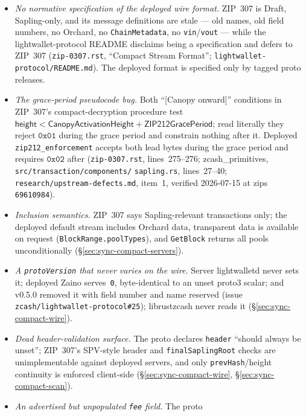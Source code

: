 \documentclass[11pt,a4paper]{article}
\theoremstyle{definition}
\begin{document}
\begin{itemize}
\item \emph{No normative specification of the deployed wire format.}
  ZIP~307 is Draft, Sapling-only, and its message definitions are stale ---
  old names, old field numbers, no Orchard, no \texttt{ChainMetadata}, no
  \texttt{vin}/\texttt{vout} --- while the \textsf{lightwallet-protocol}
  README disclaims being a specification and defers to ZIP~307
  (\texttt{zip-0307.rst}, ``Compact Stream Format'';
  \texttt{lightwallet-protocol/README.md}). The deployed format is
  specified only by tagged proto releases.
\item \emph{The grace-period pseudocode bug.} Both ``[Canopy onward]''
  conditions in ZIP~307's compact-decryption procedure test $\mathsf{height}
  < \mathsf{CanopyActivationHeight} + \mathsf{ZIP212GracePeriod}$; read
  literally they reject $\mathtt{0x01}$ during the grace period and
  constrain nothing after it. Deployed \texttt{zip212\_enforcement} accepts
  both lead bytes during the grace period and requires $\mathtt{0x02}$
  after (\texttt{zip-0307.rst}, lines~275--276;
  \textsf{zcash\_primitives},
  \texttt{src/transaction/}\allowbreak\texttt{components/}\allowbreak%
  \texttt{sapling.rs}, lines~27--40;
  \texttt{research/}\allowbreak\texttt{upstream-defects.md}, item~1,
  verified 2026-07-15 at \textsf{zips} \texttt{69610984}).
\item \emph{Inclusion semantics.} ZIP~307 says Sapling-relevant
  transactions only; the deployed default stream includes Orchard data,
  transparent data is available on request
  (\texttt{BlockRange.poolTypes}), and \texttt{GetBlock} returns all
  pools unconditionally (\S\ref{sec:sync-compact-servers}).
\item \emph{A \texttt{protoVersion} that never varies on the wire.}
  Server \textsf{lightwalletd} never sets it; deployed \textsf{Zaino}
  serves~\texttt{0}, byte-identical to an unset proto3 scalar; and
  v0.5.0 removed it with field number and name reserved
  (issue \texttt{zcash/lightwallet-protocol\#25}); \textsf{librustzcash}
  never reads it (\S\ref{sec:sync-compact-wire}).
\item \emph{Dead header-validation surface.} The proto declares
  \texttt{header} ``should always be unset''; ZIP~307's SPV-style header and
  \texttt{finalSaplingRoot} checks are unimplementable against deployed
  servers, and only \texttt{prevHash}/height continuity is enforced
  client-side (\S\ref{sec:sync-compact-wire},
  \S\ref{sec:sync-compact-scan}).
\item \emph{An advertised but unpopulated \texttt{fee} field.} The proto

\end{itemize}
\end{document}
